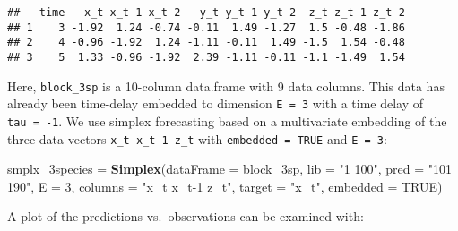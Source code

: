 \documentclass[]{article}
\newenvironment{Shaded}{\begin{snugshade}}{\end{snugshade}}
\newcommand{\CharTok}[1]{\textcolor[rgb]{0.31,0.60,0.02}{#1}}
\newcommand{\DataTypeTok}[1]{\textcolor[rgb]{0.13,0.29,0.53}{#1}}
\newcommand{\DecValTok}[1]{\textcolor[rgb]{0.00,0.00,0.81}{#1}}
\newcommand{\FloatTok}[1]{\textcolor[rgb]{0.00,0.00,0.81}{#1}}
\newcommand{\KeywordTok}[1]{\textcolor[rgb]{0.13,0.29,0.53}{\textbf{#1}}}
\newcommand{\NormalTok}[1]{#1}
\newcommand{\OperatorTok}[1]{\textcolor[rgb]{0.81,0.36,0.00}{\textbf{#1}}}
\newcommand{\OtherTok}[1]{\textcolor[rgb]{0.56,0.35,0.01}{#1}}
\newcommand{\StringTok}[1]{\textcolor[rgb]{0.31,0.60,0.02}{#1}}
\begin{document}
\begin{verbatim}
##   time   x_t x_t-1 x_t-2   y_t y_t-1 y_t-2  z_t z_t-1 z_t-2
## 1    3 -1.92  1.24 -0.74 -0.11  1.49 -1.27  1.5 -0.48 -1.86
## 2    4 -0.96 -1.92  1.24 -1.11 -0.11  1.49 -1.5  1.54 -0.48
## 3    5  1.33 -0.96 -1.92  2.39 -1.11 -0.11 -1.1 -1.49  1.54
\end{verbatim}

Here, \texttt{block\_3sp} is a 10-column data.frame with 9 data columns.
This data has already been time-delay embedded to dimension
\texttt{E\ =\ 3} with a time delay of \texttt{tau\ =\ -1}. We use
simplex forecasting based on a multivariate embedding of the three data
vectors \texttt{x\_t\ x\_t-1\ z\_t} with \texttt{embedded\ =\ TRUE} and
\texttt{E\ =\ 3}:

\begin{Shaded}
\begin{Highlighting}[]
\NormalTok{smplx_3species =}\StringTok{ }\KeywordTok{Simplex}\NormalTok{(}\DataTypeTok{dataFrame =}\NormalTok{ block_3sp, }\DataTypeTok{lib =} \StringTok{"1 100"}\NormalTok{, }\DataTypeTok{pred =} \StringTok{"101 190"}\NormalTok{, }
    \DataTypeTok{E =} \DecValTok{3}\NormalTok{, }\DataTypeTok{columns =} \StringTok{"x_t x_t-1 z_t"}\NormalTok{, }\DataTypeTok{target =} \StringTok{"x_t"}\NormalTok{, }\DataTypeTok{embedded =} \OtherTok{TRUE}\NormalTok{)}
\end{Highlighting}
\end{Shaded}

A plot of the predictions vs.~observations can be examined with:

\begin{Shaded}
\end{Shaded}
\end{document}
